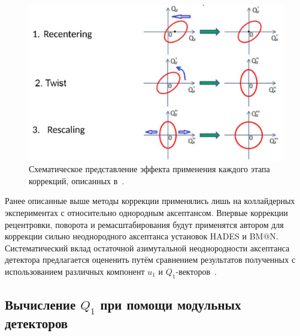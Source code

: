 \begin{figure}[h]
    \centering
    \includegraphics[width=0.5\linewidth]{images/corrections_for_nonuniformity.png}
    \caption{Схематическое представление эффекта применения каждого этапа коррекций, описанных в~\cite{Selyuzhenkov:2007zi}.}
    \label{fig:qn_corrections}
\end{figure}
Ранее описанные выше методы коррекции применялись лишь на коллайдерных экспериментах с относительно однородным аксептансом. 
Впервые коррекции рецентровки, поворота и ремасштабирования будут применятся автором для коррекции сильно неоднородного аксептанса установок HADES и BM@N.
Систематический вклад остаточной азимутальной неоднородности аксептанса детектора предлагается оцененить путём сравнением результатов полученных с использованием различных компонент $u_1$ и $Q_1$-векторов~\cite{Mamaev:2020qom,Mamaev:2023yhz}. 

\subsection{Вычисление $Q_1$ при помощи модульных детекторов}


